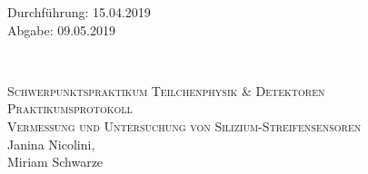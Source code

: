 



\begin{titlepage}
  \begin{flushleft}
 Durchführung: 15.04.2019\\
 Abgabe: 09.05.2019
  \end{flushleft}


\HRule\\[1,0cm]

 \begin{center}

  \textsc{\Large Schwerpunktspraktikum Teilchenphysik \& Detektoren}\\[1.5cm]
\textsc{\LARGE Praktikumsprotokoll}\\[1.5cm]
\textsc{\huge Vermessung und Untersuchung von Silizium-Streifensensoren} \\[5,5cm]

Janina Nicolini\footnotemark[1], \\
Miriam Schwarze\footnotemark[2] \\[1,0cm]



 \end{center}
\HRule

 \vfill

\end{titlepage}



\newpage



\nocite{*}
\printbibliography



